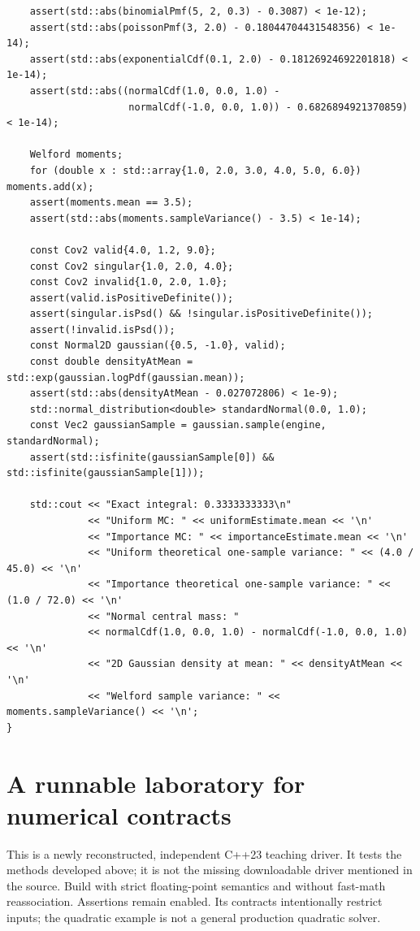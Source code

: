 \begin{verbatim}
    assert(std::abs(binomialPmf(5, 2, 0.3) - 0.3087) < 1e-12);
    assert(std::abs(poissonPmf(3, 2.0) - 0.18044704431548356) < 1e-14);
    assert(std::abs(exponentialCdf(0.1, 2.0) - 0.18126924692201818) < 1e-14);
    assert(std::abs((normalCdf(1.0, 0.0, 1.0) -
                     normalCdf(-1.0, 0.0, 1.0)) - 0.6826894921370859) < 1e-14);

    Welford moments;
    for (double x : std::array{1.0, 2.0, 3.0, 4.0, 5.0, 6.0}) moments.add(x);
    assert(moments.mean == 3.5);
    assert(std::abs(moments.sampleVariance() - 3.5) < 1e-14);

    const Cov2 valid{4.0, 1.2, 9.0};
    const Cov2 singular{1.0, 2.0, 4.0};
    const Cov2 invalid{1.0, 2.0, 1.0};
    assert(valid.isPositiveDefinite());
    assert(singular.isPsd() && !singular.isPositiveDefinite());
    assert(!invalid.isPsd());
    const Normal2D gaussian({0.5, -1.0}, valid);
    const double densityAtMean = std::exp(gaussian.logPdf(gaussian.mean));
    assert(std::abs(densityAtMean - 0.027072806) < 1e-9);
    std::normal_distribution<double> standardNormal(0.0, 1.0);
    const Vec2 gaussianSample = gaussian.sample(engine, standardNormal);
    assert(std::isfinite(gaussianSample[0]) && std::isfinite(gaussianSample[1]));

    std::cout << "Exact integral: 0.3333333333\n"
              << "Uniform MC: " << uniformEstimate.mean << '\n'
              << "Importance MC: " << importanceEstimate.mean << '\n'
              << "Uniform theoretical one-sample variance: " << (4.0 / 45.0) << '\n'
              << "Importance theoretical one-sample variance: " << (1.0 / 72.0) << '\n'
              << "Normal central mass: "
              << normalCdf(1.0, 0.0, 1.0) - normalCdf(-1.0, 0.0, 1.0) << '\n'
              << "2D Gaussian density at mean: " << densityAtMean << '\n'
              << "Welford sample variance: " << moments.sampleVariance() << '\n';
}
\end{verbatim}

\section{A runnable laboratory for numerical contracts}\label{02-foundations-ii-ch038-a-runnable-laboratory-for-numerical-contracts}

This is a newly reconstructed, independent C++23 teaching driver. It tests the methods developed above; it is not the missing downloadable driver mentioned in the source. Build with strict floating-point semantics and without fast-math reassociation. Assertions remain enabled. Its contracts intentionally restrict inputs; the quadratic example is not a general production quadratic solver.

